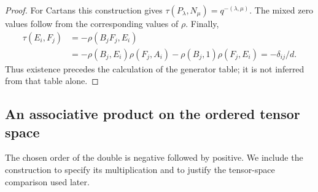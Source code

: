 \documentclass[11pt]{article}
\theoremstyle{definition}
\theoremstyle{remark}
\begin{document}
\begin{proof}
For Cartans this construction gives $\tau(P_\lambda,N_\mu)=q^{-(\lambda,\mu)}$. The mixed zero values follow from the corresponding values of $\rho$. Finally,
\[
 \begin{aligned}
 \tau(E_i,F_j)&=-\rho(B_jF_j,E_i)\\
 &=-\rho(B_j,E_i)\rho(F_j,A_i)-\rho(B_j,1)\rho(F_j,E_i)=-\delta_{ij}/d.
 \end{aligned}
\]
Thus existence precedes the calculation of the generator table; it is not inferred from that table alone.
\end{proof}

\subsection{An associative product on the ordered tensor space}
The chosen order of the double is negative followed by positive. We include the construction to specify its multiplication and to justify the tensor-space comparison used later.
\end{document}
